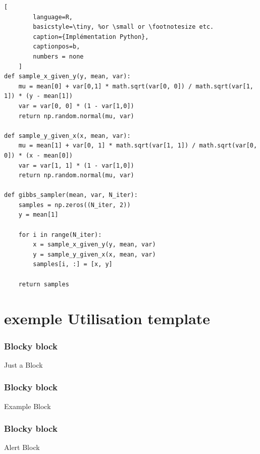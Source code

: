 \documentclass{presentation_template}
\begin{document}
\begin{frame}[fragile]
    \begin{lstlisting}[
        language=R,
        basicstyle=\tiny, %or \small or \footnotesize etc.
        caption={Implémentation Python},
        captionpos=b,
        numbers = none
    ]
def sample_x_given_y(y, mean, var):
    mu = mean[0] + var[0,1] * math.sqrt(var[0, 0]) / math.sqrt(var[1, 1]) * (y - mean[1])
    var = var[0, 0] * (1 - var[1,0])
    return np.random.normal(mu, var)

def sample_y_given_x(x, mean, var):
    mu = mean[1] + var[0, 1] * math.sqrt(var[1, 1]) / math.sqrt(var[0, 0]) * (x - mean[0])
    var = var[1, 1] * (1 - var[1,0])
    return np.random.normal(mu, var)

def gibbs_sampler(mean, var, N_iter):
    samples = np.zeros((N_iter, 2))
    y = mean[1]

    for i in range(N_iter):
        x = sample_x_given_y(y, mean, var)
        y = sample_y_given_x(x, mean, var)
        samples[i, :] = [x, y]

    return samples
\end{lstlisting}
\end{frame}


\section{exemple Utilisation template}

\begin{frame}
\frametitle{Blocky block}
\begin{block}{Just a Block}
\lipsum[1]
\end{block}
\end{frame}

\begin{frame}
\frametitle{Blocky block}
\begin{exampleblock}{Example Block}
\lipsum[1]
\end{exampleblock}
\end{frame}

\begin{frame}
\frametitle{Blocky block}
\begin{alertblock}{Alert Block}
\lipsum[1]
\end{alertblock}
\end{frame}
\end{document}
